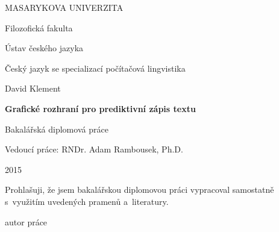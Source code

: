\documentclass[a4paper,11pt,openany]{book} %
\begin{document}
	\clearpage

	\begin{titlepage}
		\begin{center}
			{\Large\uppercase{Masarykova univerzita}}

			\vspace{1em}

			{\Large Filozofická fakulta}

			\vspace{1em}

			{\large Ústav českého jazyka}

			\vspace{1em}

			{\large Český jazyk se specializací počítačová lingvistika}

			\vspace{11em}

			{\large David Klement}
			
			\vspace{3em}
			
			{\LARGE\bf Grafické rozhraní pro prediktivní zápis textu}

			\vspace{1.5em}

			{\Large Bakalářská diplomová práce}

			\vfill
			\vspace{3em}
			Vedoucí práce: RNDr. Adam Rambousek, Ph.D.
			
			2015
		\end{center}
	\end{titlepage}


	
\par
\par\vspace*{\fill}
	\pagestyle{plain}
\begin{flushright}
	Prohlašuji, že jsem bakalářskou diplomovou práci vypracoval samostatně s~využitím uvedených pramenů a~literatury.

	\vspace{3em}

	    \makebox[2.5in][r]{\dotfill}
	    
	    autor práce

	    \par

\end{flushright}
\clearpage

\par
\par\vspace*{\fill}
\end{document}
